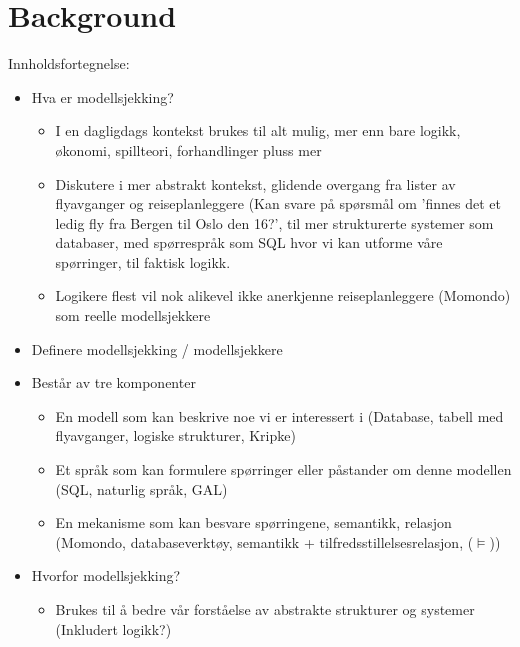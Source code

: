 \section{Background}\label{sec:back}

Innholdsfortegnelse:

\begin{itemize}

	\item{Hva er modellsjekking?}
	
	\begin{itemize}
		\item{I en dagligdags kontekst brukes til alt mulig, mer enn bare logikk, økonomi, spillteori, forhandlinger pluss mer}
		\item{Diskutere i mer abstrakt kontekst, glidende overgang fra lister av flyavganger og reiseplanleggere (Kan svare på spørsmål om 'finnes det et ledig fly fra Bergen til Oslo den 16?', til mer strukturerte systemer som databaser, med spørrespråk som SQL hvor vi kan utforme våre spørringer, til faktisk logikk.}
		\item{Logikere flest vil nok alikevel ikke anerkjenne reiseplanleggere (Momondo) som reelle modellsjekkere}
	\end{itemize}
	
	\item{Definere modellsjekking / modellsjekkere}
	
	\item{Består av tre komponenter}
	\begin{itemize}
		\item{En modell som kan beskrive noe vi er interessert i (Database, tabell med flyavganger, logiske strukturer, Kripke)}
		\item{Et språk som kan formulere spørringer eller påstander om denne modellen (SQL, naturlig språk, GAL)}
		\item{En mekanisme som kan besvare spørringene, semantikk, relasjon (Momondo, databaseverktøy, semantikk + tilfredsstillelsesrelasjon, ($\models$)})
	\end{itemize}
	
	\item{Hvorfor modellsjekking?}
	
	\begin{itemize}
	
		\item{Brukes til å bedre vår forståelse av abstrakte strukturer og systemer (Inkludert logikk?)}
		

\end{itemize}
\end{itemize}
